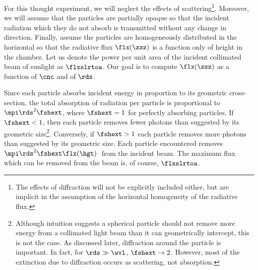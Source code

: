 \documentclass[12pt]{article}
\begin{document}
For this thought experiment, we will neglect the effects of
scattering\footnote{The effects of diffraction will not be explicitly
included either, but are implicit in the assumption of the horizontal
homogeneity of the radiative flux.}.
Moreover, we will assume that the particles are partially opaque so
that the incident radiation which they do not absorb is transmitted
without any change in direction.
Finally, assume the particles are homogeneously distributed in the
horizontal so that the radiative flux $\flx(\zzz)$ is a function only
of height in the chamber.
Let us denote the power per unit area of the incident collimated beam
of sunlight as $\flxslrtoa$.
Our goal is to compute $\flx(\zzz)$ as a function of $\cnc$ and of
$\rds$. 

Since each particle absorbs incident energy in proportion to its
geometric cross-section, the total absorption of radiation per
particle is proportional to $\mpi \rds^{2} \fshext$, where $\fshext = 1$
for perfectly absorbing particles.
If $\fshext < 1$, then each particle removes fewer photons than
suggested by its geometric size\footnote{Although intuition suggests a
spherical particle should not remove more energy from a collimated
light beam than it can geometrically intercept, this is not the case. 
As discussed later, diffraction around the particle is important. 
In fact, for $\rds \gg \wvl$, $\fshext \rightarrow 2$. 
However, most of the extinction due to diffraction occurs as
scattering, not absorption.}. 
Conversely, if $\fshext > 1$ each particle removes more photons than 
suggested by its geometric size.
Each particle encountered removes $\mpi \rds^{2} \fshext
\flx(\hgt)$\,\wxmS\ from the incident beam. 
The maximum flux which can be removed from the beam is, of course, 
$\flxslrtoa$. 
\end{document}
